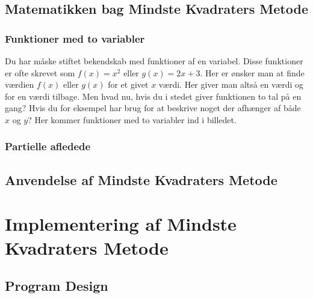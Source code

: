 \subsection{Matematikken bag Mindste Kvadraters Metode}

\subsubsection{Funktioner med to variabler}
Du har måske stiftet bekendskab med funktioner af en variabel. Disse funktioner er ofte skrevet som \begin{math}f(x) = x^2\end{math} eller \begin{math}g(x) = 2x + 3\end{math}. Her er ønsker man at finde værdien $f(x)$ eller $g(x)$ for et givet $x$ værdi. Her giver man altså en værdi og for en værdi tilbage. Men hvad nu, hvis du i stedet giver funktionen to tal på en gang? Hvis du for eksempel har brug for at beskrive noget  der afhænger af både $x$ og $y$? Her kommer funktioner med to variabler ind i billedet. 

\subsubsection{Partielle afledede}

\subsection{Anvendelse af Mindste Kvadraters Metode}


\section{Implementering af Mindste Kvadraters Metode}


\subsection{Program Design}

